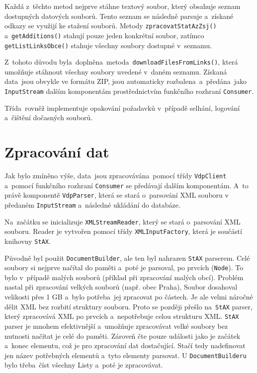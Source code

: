 Každá z~těchto metod nejprve stáhne textový soubor, který obsahuje seznam dostupných datových souborů.
Tento seznam se následně parsuje a~získané odkazy se využijí ke stažení souborů.
Metody \texttt{zpracovatStatAzZsj()} a~\texttt{getAdditions()} stahují pouze jeden konkrétní soubor,
zatímco \texttt{getListLinksObce()} stahuje všechny soubory dostupné v~seznamu.

Z~tohoto důvodu byla~doplněna~metoda~\texttt{downloadFilesFromLinks()}, která umožňuje stáhnout všechny soubory uvedené v~daném seznamu.
Získaná data~jsou obvykle ve formátu ZIP, jsou automaticky rozbalena~a~předána~jako \texttt{InputStream} dalším komponentám
prostřednictvím funkčního rozhraní \texttt{Consumer}.

Třída~rovněž implementuje opakování požadavků v~případě selhání, logování a~čištění dočasných souborů.

\section{Zpracování dat}
Jak bylo zmíněno výše, data~jsou zpracovávána~pomocí třídy \texttt{VdpClient}
a~pomocí funkčního rozhraní \texttt{Consumer} se předávají dalším komponentám.
A~to právě komponentě \texttt{VdpParser}, která se stará o~parsování XML souboru v předaném \texttt{InputStream}
a~následné ukládání do databáze.

Na~začátku se inicializuje \texttt{XMLStreamReader}, který se stará o~parsování XML souboru.
Reader je vytvořen pomocí třídy \texttt{XMLInputFactory}, která je součástí \\ knihovny \texttt{StAX}.

Původně byl použit \texttt{DocumentBuilder}, ale ten byl nahrazen \texttt{StAX} parserem.
Celé soubory si nejprve načítal do paměti a~poté je parsoval, po prvcích (\texttt{Node}).
To bylo v~případě malých souborů (příklad při zpracování malých obcí).
Problém nastal při zpracování velkých souborů (např. obec Praha),
Soubor dosahoval velikosti přes 1 GB a~bylo potřeba~jej zpracovat po částech.
Je ale velmi náročné dělit XML bez rozbití struktury souboru.
Proto se později přešlo na~\texttt{StAX} parser, který zpracovává XML po prvcích a~nepotřebuje celou strukturu XML.
\texttt{StAX} parser je mnohem efektivnější a~umožňuje zpracovávat velké soubory bez nutnosti načítat je celé do paměti.
Zároveň čte pouze události jako je začátek a~konec elementu, což je pro zpracování dat dostačující.
Stačí tedy nadefinovat jen název potřebných elementů a~tyto elementy parsovat.
U \texttt{DocumentBuilderu} bylo třeba~číst všechny Listy a~poté je zpracovávat.

